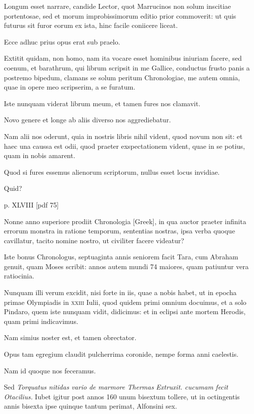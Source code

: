 \begin{parnumbers}
Longum esset narrare, candide Lector,
quot Marrucinos non solum inscitiae portentosae, sed et morum
improbissimorum editio prior commoverit: ut quis futurus sit furor
eorum ex ista, hinc facile coniicere liceat.

Ecce adhuc prius opus erat sub praelo.

Extitit quidam, non homo, nam ita vocare esset
hominibus iniuriam facere, sed coenum, et barathrum, qui librum
scripsit in me Gallice, conductus frusto panis a postremo bipedum,
clamans se solum peritum Chronologiae, me autem omnia, quae
in opere meo scripserim, a se furatum.

Iste nunquam viderat librum
meum, et tamen fures nos clamavit.

Novo genere et longe ab
aliis diverso nos aggrediebatur.

Nam alii nos oderunt, quia in
nostris libris nihil vident, quod novum non sit: et haec una caussa
est odii, quod praeter exspectationem vident, quae in se potius, quam
in nobis amarent.

Quod si fures essemus alienorum scriptorum, nullus
esset locus invidiae.

Quid?

\clearpage
p. XLVIII [pdf 75]

Nonne anno superiore prodiit Chronologia
\textgreek{[Greek]}, in qua auctor praeter infinita errorum monstra
in ratione temporum, sententias nostras, ipsa verba quoque cavillatur,
tacito nomine nostro, ut civiliter facere videatur?

Iste bonus
Chronologus, septuaginta annis seniorem facit Tara, cum Abraham
genuit, quam Moses scribit: annos autem mundi 74 maiores,
quam patiuntur vera ratiocinia.

Nunquam illi verum excidit, nisi
forte in iis, quae a nobis habet, ut in epocha primae Olympiadis in
\textsc{xxiii} Iulii, quod quidem primi omnium docuimus, et a solo
Pindaro, quem iste nunquam vidit, didicimus: et in eclipsi ante
mortem Herodis, quam primi indicavimus.

Nam simius noster est,
et tamen obrectator.

Opus tam egregium claudit pulcherrima
coronide, nempe forma anni caelestis.

Nam id quoque nos feceramus.

Sed
	\textit{Torquatus nitidas vario de marmore Thermas}
	\textit{Extruxit. cucumam fecit Otacilius.}
Iubet igitur post annos 160 unum bisextum tollere, ut in octingentis
annis bisexta ipse quinque tantum perimat, Alfonsini sex.


\end{parnumbers}
